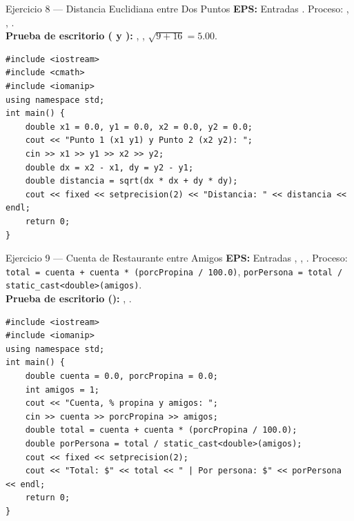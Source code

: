 \documentclass[11pt,letterpaper]{article}
\begin{document}
\begin{solucion}{Ejercicio 8 --- Distancia Euclidiana entre Dos Puntos}
\textbf{EPS:} Entradas . Proceso: , , .\\
\textbf{Prueba de escritorio ( y ):} , , $\sqrt{9 + 16} = 5.00$.
\end{solucion}
\begin{lstlisting}[style=cppmonitoria]
#include <iostream>
#include <cmath>
#include <iomanip>
using namespace std;
int main() {
    double x1 = 0.0, y1 = 0.0, x2 = 0.0, y2 = 0.0;
    cout << "Punto 1 (x1 y1) y Punto 2 (x2 y2): ";
    cin >> x1 >> y1 >> x2 >> y2;
    double dx = x2 - x1, dy = y2 - y1;
    double distancia = sqrt(dx * dx + dy * dy);
    cout << fixed << setprecision(2) << "Distancia: " << distancia << endl;
    return 0;
}
\end{lstlisting}

\begin{solucion}{Ejercicio 9 --- Cuenta de Restaurante entre Amigos}
\textbf{EPS:} Entradas , , . Proceso: \texttt{total = cuenta + cuenta * (porcPropina / 100.0)}, \texttt{porPersona = total / static\_cast<double>(amigos)}.\\
\textbf{Prueba de escritorio ():} , .
\end{solucion}
\begin{lstlisting}[style=cppmonitoria]
#include <iostream>
#include <iomanip>
using namespace std;
int main() {
    double cuenta = 0.0, porcPropina = 0.0;
    int amigos = 1;
    cout << "Cuenta, % propina y amigos: ";
    cin >> cuenta >> porcPropina >> amigos;
    double total = cuenta + cuenta * (porcPropina / 100.0);
    double porPersona = total / static_cast<double>(amigos);
    cout << fixed << setprecision(2);
    cout << "Total: $" << total << " | Por persona: $" << porPersona << endl;
    return 0;
}
\end{lstlisting}
\end{document}
